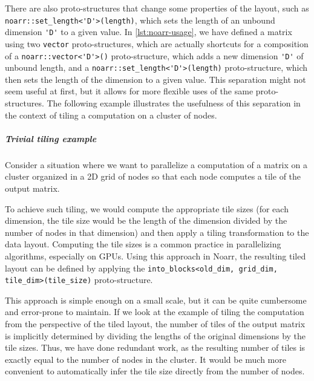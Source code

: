 There are also proto-structures that change some properties of the layout, such as \lstinline{noarr::set_length<'D'>(length)}, which sets the length of an unbound dimension \lstinline{'D'} to a given value. In \cref{lst:noarr-usage}, we have defined a matrix using two \lstinline{vector} proto-structures, which are actually shortcuts for a composition of a \lstinline{noarr::vector<'D'>()} proto-structure, which adds a new dimension \lstinline{'D'} of unbound length, and a \lstinline{noarr::set_length<'D'>(length)} proto-structure, which then sets the length of the dimension to a given value. This separation might not seem useful at first, but it allows for more flexible uses of the same proto-structures. The following example illustrates the usefulness of this separation in the context of tiling a computation on a cluster of nodes.

\subparagraph*{Trivial tiling example}
Consider a situation where we want to parallelize a computation of a matrix on a cluster organized in a 2D grid of nodes so that each node computes a tile of the output matrix.

To achieve such tiling, we would compute the appropriate tile sizes (for each dimension, the tile size would be the length of the dimension divided by the number of nodes in that dimension) and then apply a tiling transformation to the data layout. Computing the tile sizes is a common practice in parallelizing algorithms, especially on GPUs. Using this approach in Noarr, the resulting tiled layout can be defined by applying the \lstinline{into_blocks<old_dim, grid_dim, tile_dim>(tile_size)} proto-structure.

This approach is simple enough on a small scale, but it can be quite cumbersome and error-prone to maintain. If we look at the example of tiling the computation from the perspective of the tiled layout, the number of tiles of the output matrix is implicitly determined by dividing the lengths of the original dimensions by the tile sizes. Thus, we have done redundant work, as the resulting number of tiles is exactly equal to the number of nodes in the cluster. It would be much more convenient to automatically infer the tile size directly from the number of nodes.

